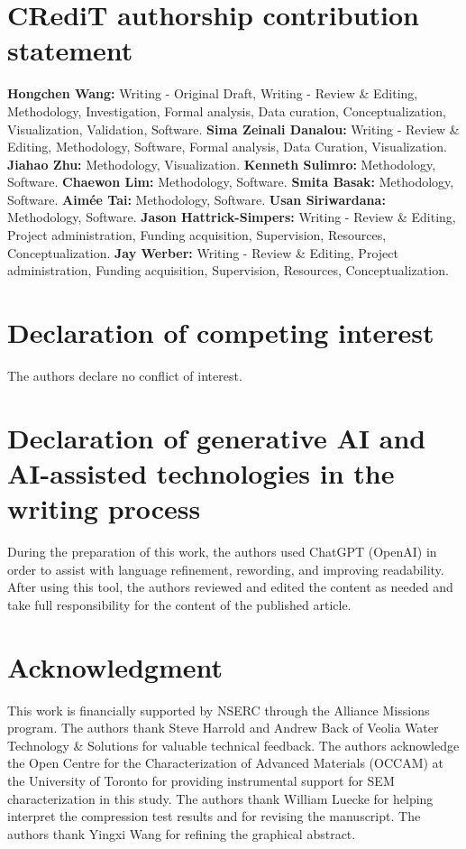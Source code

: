 \documentclass[preprint,12pt,times]{elsarticle}
\begin{document}
\section*{CRediT authorship contribution statement}
\textbf{Hongchen Wang:} Writing - Original Draft, Writing - Review \& Editing, Methodology, Investigation, Formal analysis, Data curation, Conceptualization, Visualization, Validation, Software. \textbf{Sima Zeinali Danalou:} Writing - Review \& Editing, Methodology, Software, Formal analysis, Data Curation, Visualization. \textbf{Jiahao Zhu:} Methodology, Visualization. \textbf{Kenneth Sulimro:} Methodology, Software. \textbf{Chaewon Lim:} Methodology, Software. \textbf{Smita Basak:} Methodology, Software. \textbf{Aim\'ee Tai:} Methodology, Software. \textbf{Usan Siriwardana:} Methodology, Software. \textbf{Jason Hattrick-Simpers:} Writing - Review \& Editing, Project administration, Funding acquisition, Supervision, Resources, Conceptualization. \textbf{Jay Werber:} Writing - Review \& Editing, Project administration, Funding acquisition, Supervision, Resources, Conceptualization.


\section*{Declaration of competing interest}
The authors declare no conflict of interest.

\section*{Declaration of generative AI and AI-assisted technologies in the writing process}
During the preparation of this work, the authors used ChatGPT (OpenAI) in order to assist with language refinement, rewording, and improving readability. After using this tool, the authors reviewed and edited the content as needed and take full responsibility for the content of the published article.

\section*{Acknowledgment}
This work is financially supported by NSERC through the Alliance Missions program. The authors thank Steve Harrold and Andrew Back of Veolia Water Technology \& Solutions for valuable technical feedback. The authors acknowledge the Open Centre for the Characterization of Advanced Materials (OCCAM) at the University of Toronto for providing instrumental support for SEM characterization in this study. The authors thank William Luecke for helping interpret the compression test results and for revising the manuscript. The authors thank Yingxi Wang for refining the graphical abstract.
\end{document}
